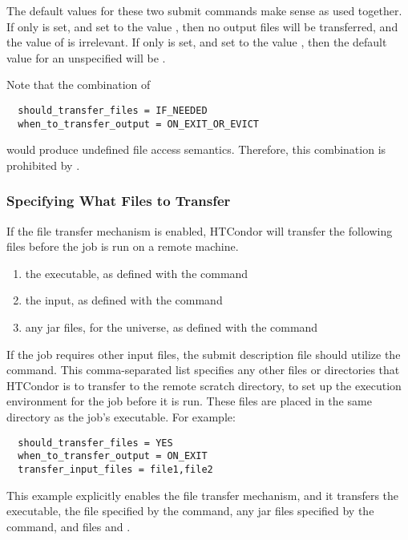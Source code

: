 The default values for these two submit commands make sense as
used together.
If only  is set, 
and set to the value , 
then no output files will be transferred, and the value of
 is irrelevant.
If only  is set,
and set to the value ,
then the default value for an unspecified
 will be .

Note that the combination of
\begin{verbatim}
  should_transfer_files = IF_NEEDED
  when_to_transfer_output = ON_EXIT_OR_EVICT
\end{verbatim}
would produce undefined file access semantics.
Therefore, this combination is prohibited by .

\subsubsection{Specifying What Files to Transfer}

If the file transfer mechanism is enabled,
HTCondor will transfer the following files before the job
is run on a remote machine.
\begin{enumerate}
  \item the executable, as defined with the  command
  \item the input, as defined with the  command
  \item any jar files, for the  universe,
  as defined with the  command
\end{enumerate}
If the job requires other input files,
the submit description file should utilize the
 command.
This comma-separated list specifies any other files or directories that HTCondor is to
transfer to the remote scratch directory,
to set up the execution environment for the job before it is run.
These files are placed in the same directory as the job's executable.
For example:

\begin{verbatim}
  should_transfer_files = YES
  when_to_transfer_output = ON_EXIT
  transfer_input_files = file1,file2 
\end{verbatim}
This example explicitly enables the file transfer mechanism,
and it transfers the executable, the file specified by the 
command, any jar files specified by the  command,
and files  and .

